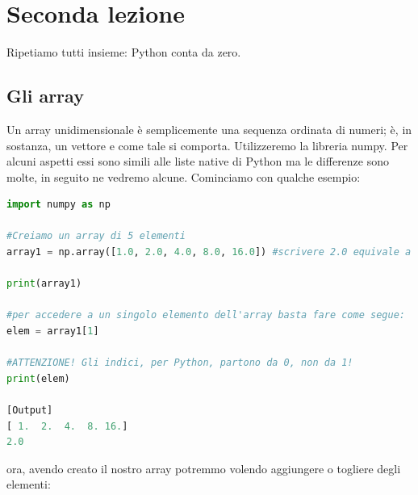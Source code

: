 \documentclass[10pt,a4paper]{article}
\begin{document}
\section{Seconda lezione}
Ripetiamo tutti insieme: Python conta da zero.
\subsection{Gli array}
Un array unidimensionale è semplicemente una sequenza ordinata di numeri; è, in sostanza, un vettore e come tale si comporta. Utilizzeremo la libreria numpy. Per alcuni aspetti essi sono simili alle liste native di Python ma le differenze sono molte, in seguito ne vedremo alcune. Cominciamo con qualche esempio:

\begin{lstlisting}[language=Python]
import numpy as np

#Creiamo un array di 5 elementi
array1 = np.array([1.0, 2.0, 4.0, 8.0, 16.0]) #scrivere 2.0 equivale a scrivere 2.

print(array1)

#per accedere a un singolo elemento dell'array basta fare come segue:
elem = array1[1]

#ATTENZIONE! Gli indici, per Python, partono da 0, non da 1!
print(elem)

[Output]
[ 1.  2.  4.  8. 16.]
2.0

\end{lstlisting}
ora, avendo creato il nostro array potremmo volendo aggiungere o togliere degli elementi:
\end{document}
